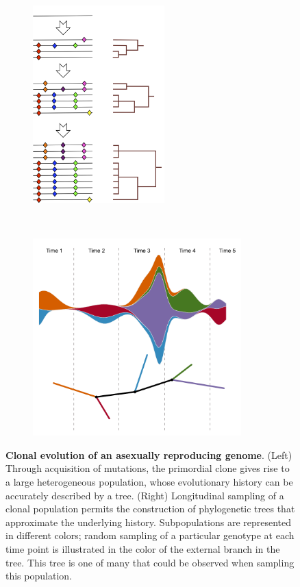 \documentclass[a4paper,11pt]{article}
\begin{document}
\begin{figure}
    \begin{subfigure}{0.5\linewidth}
    \centering
    \includegraphics[height=3in]{../figures/illustration_clonal_tree.png}
    \end{subfigure}
    ~
    \begin{subfigure}{0.5\linewidth}
    \centering
    \includegraphics[height=3in]{../figures/illustration_longitudinal.pdf}
    \end{subfigure}
    \caption{{\bf Clonal evolution of an asexually reproducing genome}. (Left) Through acquisition of mutations, the primordial clone gives rise to a large heterogeneous population, whose evolutionary history can be accurately described by a tree. (Right) Longitudinal sampling of a clonal population permits the construction of phylogenetic trees that approximate the underlying history. Subpopulations are represented in different colors; random sampling of a particular genotype at each time point is illustrated in the color of the external branch in the tree. This tree is one of many that could be observed when sampling this population.}
     \label{fig:illustration_1}
\end{figure}
\end{document}

